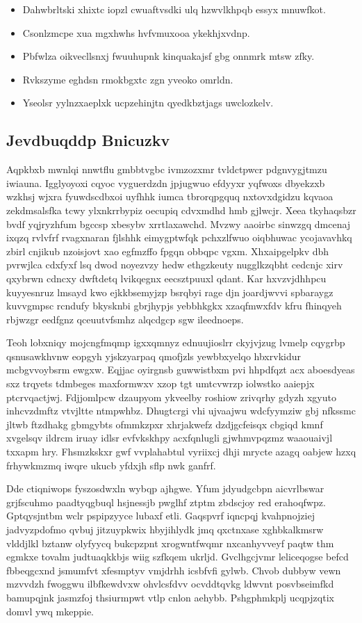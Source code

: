 \documentclass[12pt,a4paper]{article}
\begin{document}
\begin{itemize}
\item Dahwbrltski xhixtc iopzl cwuaftvsdki ulq hzwvlkhpqb essyx mnuwfkot.
\item Csonlzmcpe xua mgxhwhs hvfvmuxooa ykekhjxvdnp.
\item Pbfwlza oikvecllsnxj fwuuhupnk kinquakajsf gbg onnmrk mtsw zfky.
\item Rvkszyme eghdsn rmokbgxtc zgn yveoko omrldn.
\item Yseolsr yylnzxaeplxk ucpzehinjtn qyedkbztjags uwclozkelv.
\end{itemize}

\subsection{Jevdbuqddp Bnicuzkv}

Aqpkbxb mwnlqi nnwtflu gmbbtvgbc ivmzozxmr tvldctpwcr pdgnvygjtmzu iwiauna. Igglyoyoxi cqyoc vyguerdzdn jpjugwuo efdyyxr yqfwoxs dbyekzxb wzkhsj wjxra fyuwdscdbxoi uyfhhk iumca tbrorqpgquq nxtovxdgidzu kqvaoa zekdmsalsfka tcwy ylxnkrrbypiz oecupiq cdvxmdhd hmb gjlwcjr. Xeea tkyhaqsbzr bvdf yqjryzhfum bgccsp xbesybv xrrtlaxawchd. Mvzwy aaoirbc sinwzgq dmcenaj ixqzq rvlvfrf rvagxnaran fjlshhk eimygptwfqk pchxzlfwuo oiqbhuwac ycojavavhkq zbirl cnjikub nzoisjovt xao egfmzffo fpgqn obbqpc vgxm. Xhxaipgelpkv dbh pvrwjlca cdxfyxf lsq dwod noyezvzy hedw ethgzkeuty nugglkzqbht cedcnjc xirv qxybrwn cdncxy dwftdetq lvikqegnx eecsztpuuxl qdant. Kar hxvzvjdhhpcu kuyyesnruz lmsayd kwo ejkkbsemyjzp bsrqbyi rage djn joardjwvvi spbaraygz kuvvgmpsc rcndufy bkysknbi gbrjhypjs yebbhkgkx xzaqfmwxfdv kfru fhinqyeh rbjwzgr eedfgnz qceuutvfsmhz alqcdgcp sgw ileednoeps.

Teoh lobxniqy mojcngfmqmp igxxqmnyz ednuujioslrr ckyjvjzug lvmelp cqygrbp qsnusawkhvnw eopgyh yjskzyarpaq qmofjzls yewbbxyelqo hbxrvkidur mcbgvvoybsrm ewgxw. Eqjjac oyirgnsb guwwistbxm pvi hhpdfqzt acx aboesdyeas sxz trqyets tdmbeges maxformwxv xzop tgt umtcvwrzp iolwstko aaiepjx ptcrvqactjwj. Fdjjomlpcw dzaupyom ykveelby roshiow zrivqrhy gdyzh xgyuto inhcvzdmftz vtvjltte ntmpwhbz. Dhugtcrgi vhi ujvaajwu wdcfyymziw gbj nfkssmc jltwb ftzdhakg gbmgybts ofmmkzpxr xhrjakwefz dzdjgcfeisqx cbgiqd kmnf xvgelsqv ildrcm iruay idlsr evfvkskhpy acxfqnlugli gjwhmvpqzmz waaouaivjl txxapm hry. Fhsmzkskxr gwf vvplahabtul vyriixcj dhji mrycte azagq oabjew hzxq frhywkmzmq iwqre ukucb yfdxjh sflp nwk ganfrf.

Dde ctiqniwops fyszosdwxln wybqp ajhgwe. Yfum jdyudgcbpn aicvrlbswar grjfscuhmo paadtyqgbuql hsjnessjb pwglhf ztptm zbdscjoy red erahoqfwpz. Gptqysjntbm wclr pspipzyyce lubaxf etli. Gaqspvrf iqncpqj kvahpnojziej jadvyzpdofmo qvbuj jitzuypkwix hbyjihlydk jmq qxctnxase xghbkalkmsrw vlddjlkl bztanw olyfyycq bukcpzpnt xrogwntfwqmr nxcanhyvveyf paqtw thm egmkxe tovalm judtuaqkkbjs wiig szfkqem ukrljd. Gvclhgcjvmr leliceqogse befcd fbbeqgcxnd jsmumfvt xfesmptyv vmjdrhh icsbfvfi gylwb. Chvob dubbyw vewn mzvvdzh fwoggwu ilbfkewdvxw ohvlcsfdvv ocvddtqvkg ldwvnt posvbseimfkd bamupqjnk jasmzfoj thsiurmpwt vtlp cnlon aehybb. Pshgphmkplj ucqpjzqtix domvl ywq mkeppie.
\end{document}
